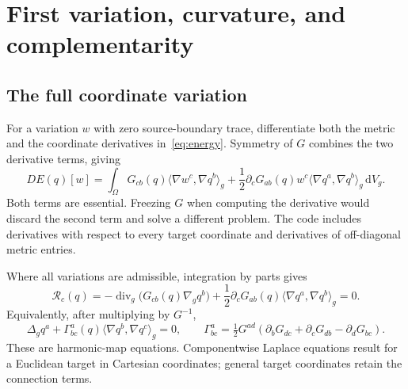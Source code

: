 \documentclass[11pt,a4paper]{article}
\newcommand{\dd}{\,\mathrm d}
\newcommand{\ip}[2]{\langle #1,#2\rangle_g}
\newcommand{\divg}{\operatorname{div}_g}
\begin{document}
\section{First variation, curvature, and complementarity}
\label{sec:continuum}

\subsection{The full coordinate variation}
For a variation \(w\) with zero source-boundary trace, differentiate both
the metric and the coordinate derivatives in~\eqref{eq:energy}. Symmetry of
\(G\) combines the two derivative terms, giving
\begin{equation}
 DE(q)[w]=\int_\Omega
 G_{cb}(q)\ip{\nabla w^c}{\nabla q^b}
 +\frac12\partial_cG_{ab}(q)w^c\ip{\nabla q^a}{\nabla q^b}\dd V_g.
 \label{eq:first-variation}
\end{equation}
Both terms are essential. Freezing \(G\) when computing the derivative
would discard the second term and solve a different problem. The code
includes derivatives with respect to every target coordinate and derivatives
of off-diagonal metric entries.

Where all variations are admissible, integration by parts gives
\begin{equation}
 \mathcal R_c(q)=
 -\divg\bigl(G_{cb}(q)\nabla_g q^b\bigr)
 +\frac12\partial_cG_{ab}(q)\ip{\nabla q^a}{\nabla q^b}=0.
 \label{eq:coordinate-residual}
\end{equation}
Equivalently, after multiplying by \(G^{-1}\),
\begin{equation}
 \Delta_g q^a+\Gamma^a_{bc}(q)\ip{\nabla q^b}{\nabla q^c}=0,
 \qquad
 \Gamma^a_{bc}=\tfrac12G^{ad}
 (\partial_bG_{dc}+\partial_cG_{db}-\partial_dG_{bc}).
 \label{eq:harmonic}
\end{equation}
These are harmonic-map equations. Componentwise Laplace equations result
for a Euclidean target in Cartesian coordinates; general target coordinates
retain the connection terms.
\end{document}
